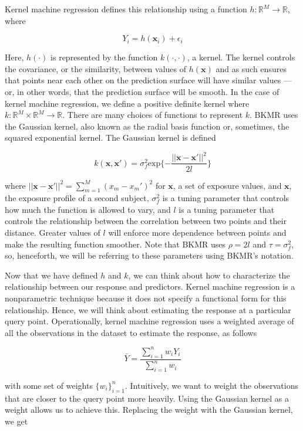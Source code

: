 \documentclass[12pt, twoside]{amherstthesis}
\begin{document}
Kernel machine regression defines this relationship using a function \(h: \mathbb{R}^M \rightarrow \mathbb{R}\), where

\[
Y_i = h(\textbf{x}_i) + \epsilon_i
\]

Here, \(h(\cdot)\) is represented by the function \(k(\cdot, \cdot)\), a kernel. The kernel controls the covariance, or the similarity, between values of \(h(\textbf{x})\) and as such ensures that points near each other on the prediction surface will have similar values --- or, in other words, that the prediction surface will be smooth. In the case of kernel machine regression, we define a positive definite kernel where \(k: \mathbb{R}^M\times \mathbb{R}^M \rightarrow \mathbb{R}\). There are many choices of functions to represent \(k\). BKMR uses the Gaussian kernel, also known as the radial basis function or, sometimes, the squared exponential kernel. The Gaussian kernel is defined

\[
k(\textbf{x}, \textbf{x}') = \sigma_f^2\textrm{exp}\{
-\frac{||\textbf{x}-\textbf{x}'||^2}{2l}\}
\]

\noindent where \(||\textbf{x}-\textbf{x}'||^2 = \sum_{m=1}^M{(x_{m}-x_{m}')^2}\) for \(\textbf{x}\), a set of exposure values, and \(\textbf{x}\), the exposure profile of a second subject, \(\sigma_f^2\) is a tuning parameter that controls how much the function is allowed to vary, and \(l\) is a tuning parameter that controls the relationship between the correlation between two points and their distance. Greater values of \(l\) will enforce more dependence between points and make the resulting function smoother. Note that BKMR uses \(\rho=2l\) and \(\tau=\sigma_f^2\), so, henceforth, we will be referring to these parameters using BKMR's notation.

Now that we have defined \(h\) and \(k\), we can think about how to characterize the relationship between our response and predictors. Kernel machine regression is a nonparametric technique because it does not specify a functional form for this relationship. Hence, we will think about estimating the response at a particular query point. Operationally, kernel machine regression uses a weighted average of all the observations in the dataset to estimate the response, as follows

\[
\bar{Y} = \frac{\sum_{i=1}^nw_iY_i}{\sum_{i=1}^nw_i}
\]

\noindent with some set of weights \(\{w_i\}_{i=1}^n\). Intuitively, we want to weight the observations that are closer to the query point more heavily. Using the Gaussian kernel as a weight allows us to achieve this. Replacing the weight with the Gaussian kernel, we get
\end{document}
